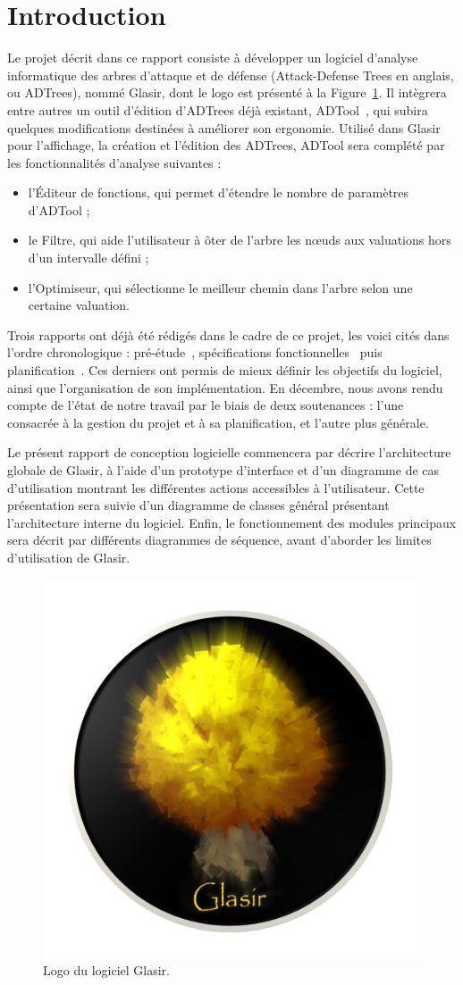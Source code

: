 \section{Introduction}
    \label{sec:intro}

    Le projet décrit dans ce rapport consiste à développer un logiciel d'analyse informatique des arbres d'attaque et de défense (\og Attack-Defense Trees \fg{} en anglais, ou ADTrees), nommé Glasir, dont le logo est présenté à la {\sc Figure}~\ref{fig:glasir}. Il intègrera entre autres un outil d'édition d'ADTrees déjà existant, ADTool~\cite{ADTool}, qui subira quelques modifications destinées à améliorer son ergonomie. Utilisé dans Glasir pour l'affichage, la création et l'édition des ADTrees, ADTool sera complété par les fonctionnalités d'analyse suivantes :

    \begin{itemize}
    	\item l'Éditeur de fonctions, qui permet d'étendre le nombre de paramètres d'ADTool ;
    	\item le Filtre, qui aide l'utilisateur à ôter de l’arbre les nœuds aux valuations hors d'un intervalle défini ;
    	\item l'Optimiseur, qui sélectionne le meilleur chemin dans l'arbre selon une certaine valuation.
    \end{itemize} 

    Trois rapports ont déjà été rédigés dans le cadre de ce projet, les voici cités dans l'ordre chronologique : pré-étude~\cite{pre_etude}, spécifications fonctionnelles~\cite{spec_fonc} puis planification~\cite{planif}. Ces derniers ont permis de mieux définir les objectifs du logiciel, ainsi que l'organisation de son implémentation. En décembre, nous avons rendu compte de l'état de notre travail par le biais de deux soutenances : l'une consacrée à la gestion du projet et à sa planification, et l'autre plus générale. 

    Le présent rapport de conception logicielle commencera par décrire l'architecture globale de Glasir, à l'aide d'un prototype d'interface et d'un diagramme de cas d'utilisation montrant les différentes actions accessibles à l'utilisateur. Cette présentation sera suivie d'un diagramme de classes général présentant l'architecture interne du logiciel. Enfin, le fonctionnement des modules principaux sera décrit par différents diagrammes de séquence, avant d'aborder les limites d'utilisation de Glasir.

    \vspace{10mm}

    \begin{figure}[H]
        \centering
        \includegraphics[height=0.5\textwidth]{figure/glasir.png}
        \caption{Logo du logiciel Glasir.}
        \label{fig:glasir}
    \end{figure}
